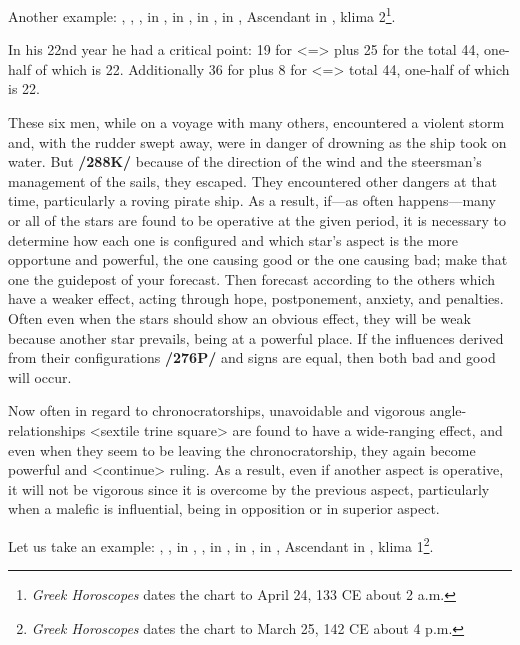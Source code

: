 Another example: \Sun, \Mercury, \Venus, \Moon\xspace in \Taurus, \Saturn\xspace in \Sagittarius, \Jupiter\xspace in \Scorpio, \Mars\xspace in \Leo, Ascendant in \Pisces, klima 2\footnote{\textit{Greek Horoscopes} dates the chart to  April 24, 133 CE about 2 a.m.}.

In his 22nd year he had a critical point: 19 for \Leo\xspace <=\Sun> plus 25 for the \Moon\xspace total 44, one-half of which is 22. Additionally 36 for \Scorpio\xspace plus 8 for \Taurus\xspace <=\Venus> total 44, one-half of which is 22.

These six men, while on a voyage with many others, encountered a violent storm and, with the rudder swept away, were in danger of drowning as the ship took on water. But \textbf{/288K/} because of the direction of the wind and the steersman’s management of the sails, they escaped. They encountered other dangers at that time, particularly a roving pirate ship. As a result, if—as often happens—many or all of the stars are found to be operative at the given period,
it is necessary to determine how each one is configured and which star’s aspect is the more opportune and powerful, the one causing good or the one causing bad; make that one the guidepost of your forecast. Then forecast according to the others which have a weaker effect, acting through hope, postponement, anxiety, and penalties.  Often even when the stars should show an obvious effect, they will be weak because another star prevails, being at a powerful place. If the influences derived from their configurations \textbf{/276P/} and signs are equal, then both bad and good will occur. 

Now often in regard to chronocratorships, unavoidable and vigorous angle-relationships <sextile trine square> are found to have a wide-ranging effect, and even when they seem to be leaving the chronocratorship, they again become powerful and <continue> ruling. As a result, even if another aspect is operative, it will not be vigorous since it is overcome by the previous aspect, particularly when a malefic is influential, being in opposition or in superior aspect.

Let us take an example: \Sun, \Saturn, \Mercury\xspace in \Aries, \Moon, \Jupiter\xspace in \Leo, \Mars\xspace in \Taurus, \Venus\xspace in \Aquarius, Ascendant in \Virgo, klima 1\footnote{\textit{Greek Horoscopes} dates the chart to March 25, 142 CE about 4 p.m.}.

